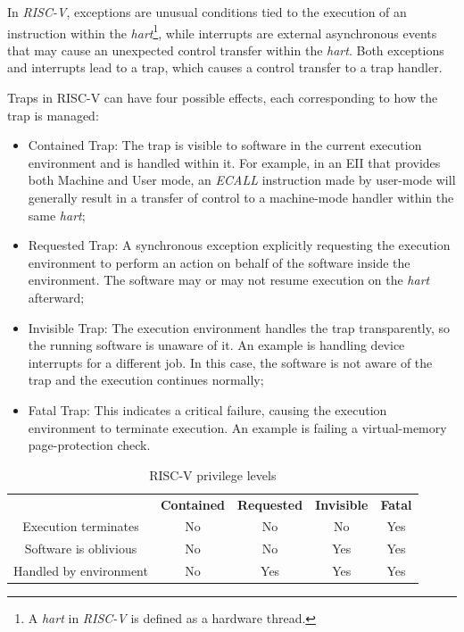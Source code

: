 In \textit{RISC-V}, exceptions are unusual conditions tied to the execution of an
instruction within the \textit{hart}\footnote{A \textit{hart} in \textit{RISC-V}
is defined as a hardware thread.}, while interrupts are external asynchronous
events that may cause an unexpected control transfer within the \textit{hart}.
Both exceptions and interrupts lead to a trap, which causes a control transfer to
a trap handler.

Traps in RISC-V can have four possible effects, each corresponding to how the
trap is managed:

\begin{itemize}
  \item Contained Trap: The trap is visible to software in the current execution
    environment and is handled within it. For example, in an EII that provides
    both Machine and User mode, an \textit{ECALL} instruction made by user-mode
    will generally result in a transfer of control to a machine-mode handler
    within the same \textit{hart};

  \item Requested Trap: A synchronous exception explicitly requesting the
    execution environment to perform an action on behalf of the software inside
    the environment. The software may or may not resume execution on the \textit{hart}
    afterward;

  \item Invisible Trap: The execution environment handles the trap transparently,
    so the running software is unaware of it. An example is handling device
    interrupts for a different job. In this case, the software is not aware of
    the trap and the execution continues normally;

  \item Fatal Trap: This indicates a critical failure, causing the execution environment
    to terminate execution. An example is failing a virtual-memory page-protection
    check.
\end{itemize}

\begin{table}
  \centering
  \begin{tabular}{|c|c|c|c|c|}
    \hline
    \textbf{}                           & \textbf{Contained} & \textbf{Requested} & \textbf{Invisible} & \textbf{Fatal} \\
    \hhline{=====} Execution terminates & No                 & No                 & No                 & Yes            \\
    \hline
    Software is oblivious               & No                 & No                 & Yes                & Yes            \\
    \hline
    Handled by environment              & No                 & Yes                & Yes                & Yes            \\
    \hline
  \end{tabular}
  \caption{RISC-V privilege levels}
  \label{tab:traps}
\end{table}

